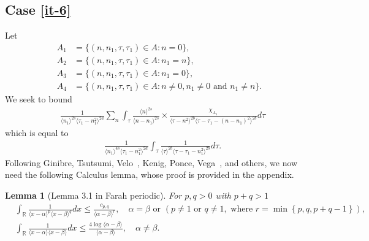 \documentclass[12pt,reqno]{amsart}
\numberwithin{equation}{section}  %
\newcommand{\rr}{\mathbb{R}}
\newtheorem{lemma}[theorem]{Lemma}
\begin{document}
 \subsection{Case \eqref{it-6}} 
\label{ssec:case-it-6}
Let 
%
%
\begin{align*}
A_1&=\{(n, n_1, \tau, \tau_1)\in A: n=0\},\\
A_2&=\{(n, n_1, \tau, \tau_1)\in A: n_1 = n \},\\
A_3&=\{(n, n_1, \tau, \tau_1)\in A: n_1=0 \},\\
A_4&=\{(n, n_1, \tau, \tau_1)\in A: n \neq 0, n_1 \neq 0 \text{ and } n_1 \neq n \}.
\end{align*} 
%
%
%
We seek to bound
\begin{equation*}
\begin{split}
  & \frac{1}{\langle n_{1} \rangle ^{2s}
  \langle \tau_{1} - n_{1}^{2} \rangle
  ^{2a}} \sum_{n } \int_{\tau} \frac{\langle n \rangle ^{2s}}{\langle
  n - n_{1}\rangle ^{2s}}  \times \frac{\chi_{A_{1}}}{\langle
  \tau - n^{2}  \rangle^{2b}  \langle \tau - \tau_{1} - (n - n_{1})^{2}
  \rangle^{2b} } d \tau 
\end{split}
\end{equation*}
which is equal to 
%
\begin{equation}
  \label{case-1-term-1-reduc}
\begin{split}
  & \frac{1}{\langle n_{1} \rangle ^{4s}
  \langle \tau_{1} - n_{1}^{2} \rangle
  ^{2a}} \int_{\tau} \frac{1}{\langle
  \tau  \rangle^{2b}  \langle \tau - \tau_{1} - n_{1}^{2}
  \rangle^{2b} } d \tau.
\end{split}
\end{equation}
%
Following Ginibre, Tsutsumi, Velo~\cite{Ginibre:1997fk}, Kenig, Ponce, Vega~\cite{Kenig:1996aa}, and others,
we now need the following Calculus lemma, whose proof is provided in the
appendix.
%
%
%
%
%
%
%
\begin{lemma}[Lemma 3.1 in Farah periodic]
	\label{lem:calc}
 For $p, q > 0$ with $p +q >1$
 \begin{equation*}
\begin{split}
  & \int_{\rr} \frac{1}{\langle x - \alpha \rangle ^{p} \langle x -
  \beta \rangle
  ^{q}} d x
  \le \frac{c_{p,q}}{\langle \alpha - \beta \rangle ^{r}}, \quad \alpha=\beta
  \text{ or } (p \neq 1 \text{ or } q \neq 1, \text{ where } r =
  \min\left\{ p, q, p+q-1 \right\}), 
  \\
  &\int_{\rr} \frac{1}{\langle x - \alpha \rangle  \langle x - \beta
  \rangle } d x
  \le  \frac{4 \log \langle \alpha - \beta \rangle }{\langle \alpha - \beta
  \rangle }, \quad \alpha \neq \beta.
\end{split}
\end{equation*}
\end{lemma}
\end{document}
